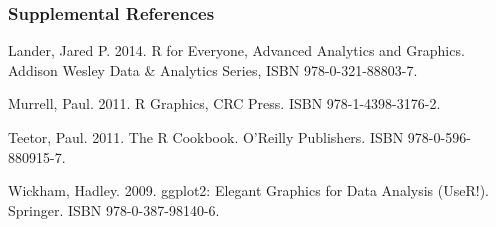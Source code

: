 \documentclass[10pt]{beamer}
\begin{document}
\begin{frame}
\frametitle{Supplemental References}

\bi
\item Lander, Jared P.  2014.  R for Everyone, Advanced Analytics and
  Graphics.  Addison Wesley Data \& Analytics Series, ISBN
  978-0-321-88803-7.

\item Murrell, Paul.  2011.  R Graphics, CRC Press.  ISBN
  978-1-4398-3176-2.

\item Teetor, Paul. 2011.  The R Cookbook.  O'Reilly Publishers. ISBN
  978-0-596-880915-7.

\item Wickham, Hadley.  2009.  ggplot2: Elegant Graphics for Data
  Analysis (UseR!).  Springer.  ISBN 978-0-387-98140-6.
\ei
\end{frame}
\end{document}
